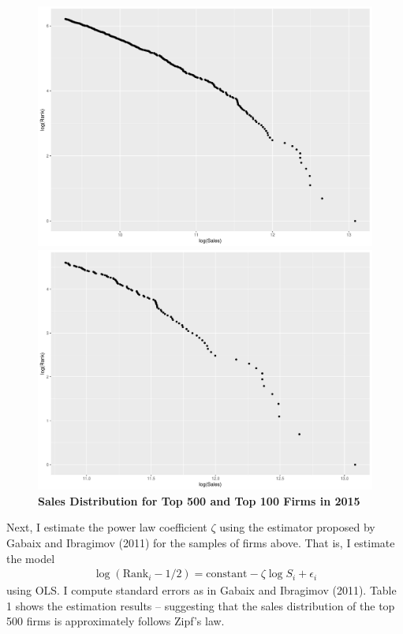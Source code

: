 \documentclass[12pt]{article}
\newcommand{\e}{\epsilon}
\begin{document}
\begin{figure}[htpb!]
    \centering
    \caption{\textbf{Sales Distribution for Top 500 and Top 100 Firms in 2015}}
    \begin{minipage}{0.5\textwidth}
        \includegraphics[width=1\textwidth]{2015-sales-500.pdf}
    \end{minipage}\hfill
    \begin{minipage}{0.5\textwidth}
        \includegraphics[width=1\textwidth]{2015-sales-100.pdf}
    \end{minipage}
\end{figure}

Next, I estimate the power law coefficient $\zeta$ using the estimator proposed by Gabaix and Ibragimov (2011) for the samples of firms above. That is, I estimate the model
\begin{align*}
\log(\text{Rank}_i - 1/2) = \text{constant} - \zeta \log S_{i} + \e_i
\end{align*}
using OLS. I compute standard errors as in Gabaix and Ibragimov (2011). Table 1 shows the estimation results -- suggesting that the sales distribution of the top 500 firms is approximately follows Zipf's law.
\end{document}
